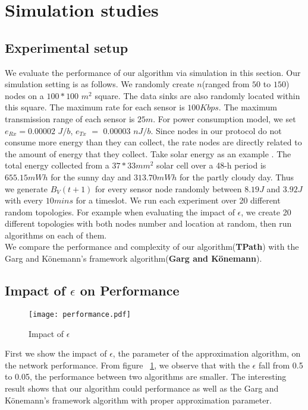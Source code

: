\documentclass{article}
\begin{document}
\section{Simulation studies}
\subsection{Experimental setup}
We evaluate the performance of our algorithm via simulation in this section.
Our simulation setting is as follows. We randomly create $n$(ranged from $50$ to $150$) nodes
on a $100*100$ $m^2$ square. The data sinks are also randomly located within this square. The maximum rate for each sensor is $100 Kbps$. The maximum transmission range of each sensor is $25 m$. For power consumption model, we set $e_{Rx} = 0.00002$ $J/b$, $e_{Tx}$ $=$ $0.00003$ $nJ/b$. Since nodes in our protocol do not 
consume more energy than they can collect, the rate nodes are directly related to the amount of energy that they collect. Take solar energy as an example . The total energy collected from a $37 * 33 mm^2$ solar cell over a 48-h period is $655.15 mWh$ for the sunny day and $313.70 mWh$ for the partly cloudy day. Thus we generate $B_V(t+1)$ for every sensor node randomly between $8.19 J$ and $3.92 J$ with every $10 mins$ for a timeslot. We run each experiment over 20 different random topologies. For example when evaluating the impact of $\epsilon$, we create 20 different topologies with both nodes number and location at random, then run algorithms on each of them.\\
We compare the performance and complexity of our algorithm(\textbf{TPath}) with the Garg and K\"{o}nemann's framework algorithm(\textbf{Garg and K\"{o}nemann}).

\subsection{Impact of $\epsilon$ on Performance}
\begin{figure}[H]
\centering
\texttt{[image: performance.pdf]} 
\caption{Impact of $\epsilon$}
\label{f1}
\end{figure}
First we show the impact of $\epsilon$, the parameter of the approximation algorithm, on the network performance. From figure ~\ref{f1}, we observe that with the $\epsilon$ fall from 0.5 to 0.05, the performance between two algorithms are smaller. The interesting result shows that our algorithm could performance as well as the Garg and K\"{o}nemann's framework algorithm with proper approximation parameter.
\end{document}
